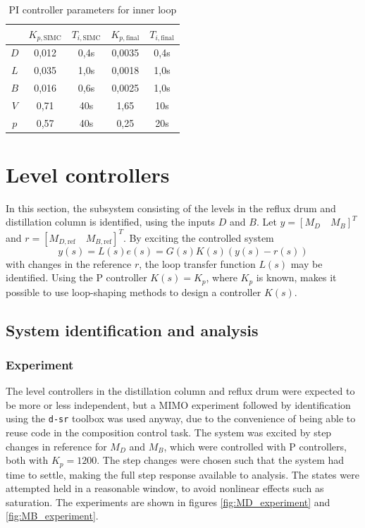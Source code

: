 \documentclass[12pt]{article}
\begin{document}
\begin{table}
\centering
\begin{tabular}{c | c | c : c | c}
& $K_{p, \textrm{SIMC}}$ & $T_{i, \textrm{SIMC}}$ & $K_{p, \textrm{final}}$ & $T_{i, \textrm{final}}$ \\ \hline
$D$ & 0,012 & 0,4s & 0,0035 & 0,4s\\
$L$ &  0,035 & 1,0s & 0,0018 & 1,0s \\
$B$ & 0,016 & 0,6s & 0,0025 & 1,0s \\
$V$ & 0,71 & 40s & 1,65 & 10s \\
$p$ & 0,57 & 40s & 0,25 & 20s
\end{tabular}
\caption{PI controller parameters for inner loop}
\label{tab:inner_loop_PI_parameters}
\end{table}


\newpage
\section{Level controllers}
In this section, the subsystem consisting of the levels in the reflux drum and distillation column is identified, using the inputs $D$ and $B$. Let $y = [M_D \quad M_B]^T$ and $r = [M_{D, \textrm{ref}} \quad M_{B, \textrm{ref}}]^T$. By exciting the controlled system
\begin{equation}
y(s) = L(s)e(s) = G(s) K(s) (y(s) - r(s))
\end{equation}
with changes in the reference $r$, the loop transfer function $L(s)$ may be identified. Using the P controller $K(s) = K_p$, where $K_p$ is known, makes it possible to use loop-shaping methods to design a controller $K(s)$.

\subsection{System identification and analysis}
\subsubsection{Experiment}
The level controllers in the distillation column and reflux drum were expected to be more or less independent, but a MIMO experiment followed by identification using the \texttt{d-sr} toolbox was used anyway, due to the convenience of being able to reuse code in the composition control task. The system was excited by step changes in reference for $M_D$ and $M_B$, which were controlled with P controllers, both with $K_p = 1200$. The step changes were chosen such that the system had time to settle, making the full step response available to analysis. The states were attempted held in a reasonable window, to avoid nonlinear effects such as saturation. The experiments are shown in figures \ref{fig:MD_experiment} and \ref{fig:MB_experiment}.
\end{document}
